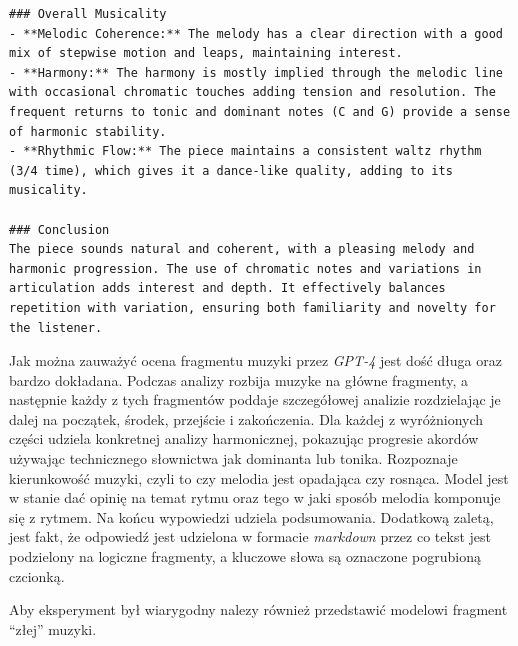 \documentclass[data-science]{agh-wi} %
\begin{document}
\begin{verbatim}
### Overall Musicality
- **Melodic Coherence:** The melody has a clear direction with a good mix of stepwise motion and leaps, maintaining interest.
- **Harmony:** The harmony is mostly implied through the melodic line with occasional chromatic touches adding tension and resolution. The frequent returns to tonic and dominant notes (C and G) provide a sense of harmonic stability.
- **Rhythmic Flow:** The piece maintains a consistent waltz rhythm (3/4 time), which gives it a dance-like quality, adding to its musicality.

### Conclusion
The piece sounds natural and coherent, with a pleasing melody and harmonic progression. The use of chromatic notes and variations in articulation adds interest and depth. It effectively balances repetition with variation, ensuring both familiarity and novelty for the listener.
\end{verbatim}

Jak można zauważyć ocena fragmentu muzyki przez \textit{GPT-4} jest dość długa oraz bardzo dokładana. Podczas analizy rozbija muzyke na główne fragmenty, a następnie każdy z tych fragmentów poddaje szczegółowej analizie rozdzielając je dalej na początek, środek, przejście i zakończenia. Dla każdej z wyróżnionych części udziela konkretnej analizy harmonicznej, pokazując progresie akordów używając technicznego słownictwa jak dominanta lub tonika. Rozpoznaje kierunkowość muzyki, czyli to czy melodia jest opadająca czy rosnąca. Model jest w stanie dać opinię na temat rytmu oraz tego w jaki sposób melodia komponuje się z rytmem. Na końcu wypowiedzi udziela podsumowania. Dodatkową zaletą, jest fakt, że odpowiedź jest udzielona w formacie \textit{markdown} przez co tekst jest podzielony na logiczne fragmenty, a kluczowe słowa są oznaczone pogrubioną czcionką.

Aby eksperyment był wiarygodny nalezy również przedstawić modelowi fragment ``złej'' muzyki.
\end{document}
